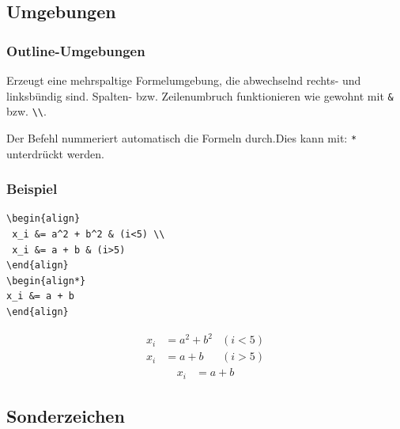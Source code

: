 \subsection{Umgebungen}

\begin{frame}[fragile]
\frametitle{Outline-Umgebungen}
\begin{description}[<+->]
 \item[align] Erzeugt eine mehrspaltige Formelumgebung, die abwechselnd rechts- und linksbündig sind. Spalten- bzw. Zeilenumbruch funktionieren wie gewohnt mit \lstinline[style=Latex]+&+ bzw. \lstinline[style=Latex]+\\+.
 \end{description}
 Der Befehl nummeriert automatisch die Formeln durch.Dies kann mit: \lstinline[style=Latex]+*+ unterdrückt werden.
\end{frame}

\begin{frame}[fragile]
\frametitle{Beispiel}
\begin{lstlisting}[style=Latex]
\begin{align}
 x_i &= a^2 + b^2 & (i<5) \\
 x_i &= a + b & (i>5)
\end{align}
\begin{align*}
x_i &= a + b 
\end{align}
\end{lstlisting}
\pause
\vspace{1cm}
\begin{align}
 x_i &= a^2 + b^2 & (i<5) \\
 x_i &= a + b & (i>5)
\end{align}
\begin{align*}
x_i &= a + b 
\end{align*}
\end{frame}

\subsection{Sonderzeichen}

